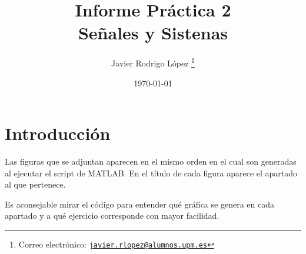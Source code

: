 \documentclass{article}
\title{\Huge Informe Práctica 2\\\vspace*{5pt}
\Large Señales y Sistenas}
\author{Javier Rodrigo López \thanks{Correo electrónico: \href{mailto:javier.rlopez@alumnos.upm.es}{\texttt{javier.rlopez@alumnos.upm.es}}}}
\date{\today}
\begin{document}
\maketitle

\tableofcontents
\setlength{\cftparskip}{0.5\baselineskip}
\listoffigures

\newpage

\section{Introducción}
Las figuras que se adjuntan aparecen en el mismo orden en el cual son generadas al ejecutar el script de MATLAB. En el título de cada figura aparece el apartado al que pertenece.

Es aconsejable mirar el código para entender qué gráfica se genera en cada apartado y a qué ejercicio corresponde con mayor facilidad.

\newpage
\end{document}
